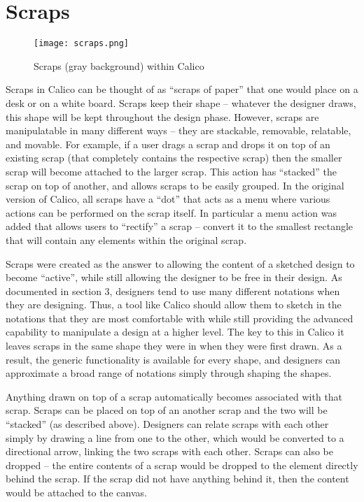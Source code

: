 \section{Scraps}

\begin{figure}[htb]
  \centering
  \texttt{[image: scraps.png]}
  \caption{Scraps (gray background) within Calico}
  \label{fig:scraps}
\end{figure}

Scraps in Calico can be thought of as ``scraps of paper'' that one would place on a desk or on a white board.
Scraps keep their shape -- whatever the designer draws, this shape will be kept throughout the design phase.
However, scraps are manipulatable in many different ways -- they are stackable, removable, relatable, and movable. 
For example, if a user drags a scrap and drops it on top of an existing scrap (that completely contains the respective scrap) then the smaller scrap will become attached to the larger scrap. This action has ``stacked'' the scrap on top of another, and allows scraps to be easily grouped.
In the original version of Calico, all scraps have a ``dot'' that acts as a menu where various actions can be performed on the scrap itself.
In particular a menu action was added that allows users to ``rectify'' a scrap -- convert it to the smallest rectangle that will contain any elements within the original scrap.

Scraps were created as the answer to allowing the content of a sketched design to become ``active'', while still allowing the designer to be free in their design.
As documented in section 3, designers tend to use many different notations when they are designing. Thus, a tool like Calico should allow them to sketch in the notations that they are most comfortable with while still providing the advanced capability to manipulate a design at a higher level.
The key to this in Calico it leaves scraps in the same shape they were in when they were first drawn. 
As a result, the generic functionality is available for every shape, and designers can approximate a broad range of notations simply through shaping the shapes.

Anything drawn on top of a scrap automatically becomes associated with that scrap.
Scraps can be placed on top of an another scrap and the two will be ``stacked'' (as described above).
Designers can relate scraps with each other simply by drawing a line from one to the other, which would be converted to a directional arrow, linking the two scraps with each other. Scraps can also be dropped -- the entire contents of a scrap would be dropped to the element directly behind the scrap. If the scrap did not have anything behind it, then the content would be attached to the canvas.



